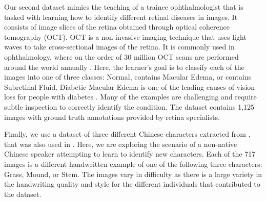 \documentclass[../main.tex]{subfiles}
\begin{document}
Our second dataset mimics the teaching of a trainee ophthalmologist that is tasked with learning how to identify different retinal diseases in images. 
It consists of image slices of the retina obtained through optical coherence tomography (OCT). 
OCT is a non-invasive imaging technique that uses light waves to take cross-sectional images of the retina. 
It is commonly used in ophthalmology, where on the order of 30 million OCT scans are performed around the world annually \cite{swanson2011ophthalmic}. 
Here, the learner's goal is to classify each of the images into one of three classes: Normal, contains Macular Edema, or contains Subretinal Fluid.
Diabetic Macular Edema is one of the leading causes of vision loss for people with diabetes \cite{romero2011managing}. 
Many of the examples are challenging and require subtle inspection to correctly identify the condition.
The dataset contains 1,125 images with ground truth annotations provided by retina specialists.


Finally, we use a dataset of three different Chinese characters extracted from \cite{liu2011casia}, that was also used in \cite{johns2015}.
Here, we are exploring the scenario of a non-native Chinese speaker attempting to learn to identify new characters. 
Each of the 717 images is a different handwritten example of one of the following three characters: Grass, Mound, or Stem. 
The images vary in difficulty as there is a large variety in the handwriting quality and style for the different individuals that contributed to the dataset. 




%
%
%
\end{document}
